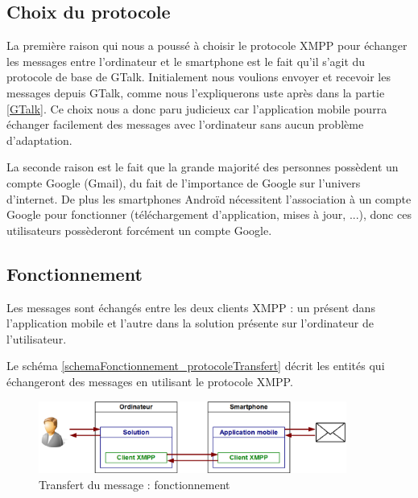 \subsection{Choix du protocole}

La première raison qui nous a poussé à choisir le protocole XMPP pour échanger les messages entre l'ordinateur et le smartphone est le fait qu'il s'agit du protocole de base de GTalk.
Initialement nous voulions envoyer et recevoir les messages depuis GTalk, comme nous l'expliquerons uste après dans la partie \ref{GTalk}.
Ce choix nous a donc paru judicieux car l'application mobile pourra échanger facilement des messages avec l'ordinateur sans aucun problème d'adaptation.

La seconde raison est le fait que la grande majorité des personnes possèdent un compte Google (Gmail), du fait de l'importance de Google sur l'univers d'internet.
De plus les smartphones Androïd nécessitent l'association à un compte Google pour fonctionner (téléchargement d'application, mises à jour, ...), donc ces utilisateurs possèderont forcément un compte Google.
\\




\subsection{Fonctionnement}

Les messages sont échangés entre les deux clients XMPP : un présent dans l'application mobile et l'autre dans la solution présente sur l'ordinateur de l'utilisateur.

Le schéma \ref{schemaFonctionnement_protocoleTransfert} décrit les entités qui échangeront des messages en utilisant le protocole XMPP.
\begin{figure}[!h]
	\center
	\includegraphics[width=0.9\textwidth]{img/schemaFonctionnement_protocoleTransfert.png}
	\caption{Transfert du message : fonctionnement}
	\label{schemaFonctionnement_siteWeb_reception}
\end{figure}
~~\\





